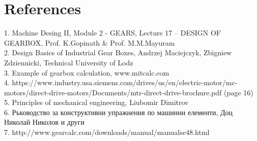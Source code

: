 \documentclass{article}
\begin{document}
\section{References}
1. Machine Desing II, Module 2 - GEARS, Lecture 17 – DESIGN OF GEARBOX, Prof. K.Gopinath \& Prof. M.M.Mayuram \\
2. Design Basics of Industrial Gear Boxes, Andrzej Maciejczyk, Zbigniew Zdziennicki, Technical University of Lodz \\
3. Example of gearbox calculation, www.mitcalc.com \\
4. https://www.industry.usa.siemens.com/drives/us/en/electric-motor/mc-motors/direct-drive-motors/Documents/mtr-direct-drive-brochure.pdf  (page 16) \\
5. Principles of mechanical engineering, Liubomir Dimitrov  \\
6. Ръководство за конструктивни упражнения по машинни елементи, Доц Николай Николов и други  \\
7. http://www.gearcalc.com/downloads/manual/manualse48.html  \\

\tableofcontents
\end{document}
